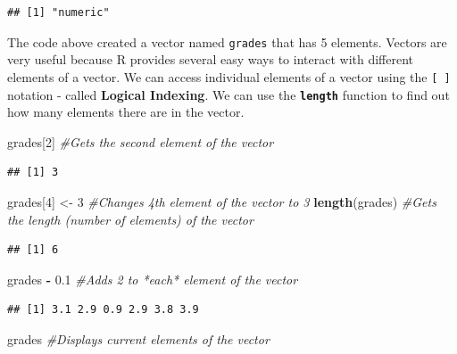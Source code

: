\documentclass[]{krantz}
\makeatletter
\newenvironment{Shaded}{\begin{snugshade}}{\end{snugshade}}
\newcommand{\KeywordTok}[1]{\textcolor[rgb]{0.27,0.27,0.27}{\textbf{#1}}}
\newcommand{\DecValTok}[1]{\textcolor[rgb]{0.06,0.06,0.06}{#1}}
\newcommand{\FloatTok}[1]{\textcolor[rgb]{0.06,0.06,0.06}{#1}}
\newcommand{\StringTok}[1]{\textcolor[rgb]{0.5,0.5,0.5}{#1}}
\newcommand{\CommentTok}[1]{\textcolor[rgb]{0.37,0.37,0.37}{\textit{#1}}}
\newcommand{\OperatorTok}[1]{\textcolor[rgb]{0.43,0.43,0.43}{\textbf{#1}}}
\newcommand{\NormalTok}[1]{#1}
\newenvironment{kframe}{%
\medskip{}
\setlength{\fboxsep}{.8em}
 \def\at@end@of@kframe{}%
 \ifinner\ifhmode%
  \def\at@end@of@kframe{\end{minipage}}%
  \begin{minipage}{\columnwidth}%
 \fi\fi%
 \def\FrameCommand##1{\hskip\@totalleftmargin \hskip-\fboxsep
 \colorbox{shadecolor}{##1}\hskip-\fboxsep
     \hskip-\linewidth \hskip-\@totalleftmargin \hskip\columnwidth}%
 \MakeFramed {\advance\hsize-\width
   \@totalleftmargin\z@ \linewidth\hsize
   \@setminipage}}%
 {\par\unskip\endMakeFramed%
 \at@end@of@kframe}
\renewenvironment{Shaded}{\begin{kframe}}{\end{kframe}}
\makeatother
\begin{document}
\begin{verbatim}
## [1] "numeric"
\end{verbatim}

The code above created a vector named \texttt{grades} that has 5
elements. Vectors are very useful because R provides several easy ways
to interact with different elements of a vector. We can access
individual elements of a vector using the \texttt{{[}\ {]}} notation -
called \textbf{Logical Indexing}. We can use the
\textbf{\texttt{length}} function to find out how many elements there
are in the vector.

\begin{Shaded}
\begin{Highlighting}[]
\NormalTok{grades[}\DecValTok{2}\NormalTok{] }\CommentTok{#Gets the second element of the vector}
\end{Highlighting}
\end{Shaded}

\begin{verbatim}
## [1] 3
\end{verbatim}

\begin{Shaded}
\begin{Highlighting}[]
\NormalTok{grades[}\DecValTok{4}\NormalTok{] <-}\StringTok{ }\DecValTok{3} \CommentTok{#Changes 4th element of the vector to 3}
\KeywordTok{length}\NormalTok{(grades) }\CommentTok{#Gets the length (number of elements) of the vector}
\end{Highlighting}
\end{Shaded}

\begin{verbatim}
## [1] 6
\end{verbatim}

\begin{Shaded}
\begin{Highlighting}[]
\NormalTok{grades }\OperatorTok{-}\StringTok{ }\FloatTok{0.1} \CommentTok{#Adds 2 to *each* element of the vector }
\end{Highlighting}
\end{Shaded}

\begin{verbatim}
## [1] 3.1 2.9 0.9 2.9 3.8 3.9
\end{verbatim}

\begin{Shaded}
\begin{Highlighting}[]
\NormalTok{grades }\CommentTok{#Displays current elements of the vector}
\end{Highlighting}
\end{Shaded}
\end{document}
